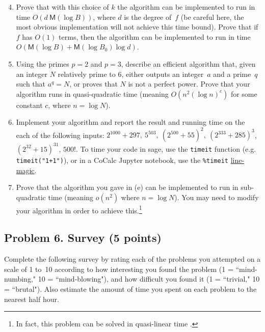 \documentclass[11pt]{article}
\newcommand{\M}{\textsf{M}}
\begin{document}
\begin{enumerate}[{\bf (a)}]
\setcounter{enumi}{3}
\item
Prove that with this choice of $k$ the algorithm can be implemented to run in time $O(d\ \M(\log B))$, where $d$ is the degree of~$f$ (be careful here, the most obvious implementation will not achieve this time bound).
Prove that if $f$ has $O(1)$ terms, then the algorithm can be implemented to run in time $O(\M(\log B) + \M(\log B_0)\log d)$.

\item
Using the primes $p=2$ and $p=3$, describe an efficient algorithm that, given an integer $N$ relatively prime to 6, either outputs an integer~$a$ and a prime~$q$ such that $a^q=N$, or proves that $N$ is not a perfect power.
Prove that your algorithm runs in quasi-quadratic time (meaning $O(n^2(\log n)^c)$ for some constant $c$, where $n=\log N$).
\end{enumerate}

\begin{enumerate}[{\bf (a)}]
\setcounter{enumi}{5}
\item
Implement your algorithm and report the result and running time on the each of the following inputs:
$2^{1000}+297,\ 5^{503},\ (2^{500}+55)^2,\ (2^{333}+285)^3$, $(2^{32}+15)^{31}$, $500!$.
To time your code in sage, use the \texttt{timeit} function (e.g. \texttt{timeit("1+1")}), or in a CoCalc Jupyter notebook, use the \texttt{\%timeit} \href{https://share.cocalc.com/share/8b892baf91f98d0cf6172b872c8ad6694d0f7204/PythonDataScienceHandbook/notebooks/01.07-Timing-and-Profiling.ipynb}{line-magic}.
\item
Prove that the algorithm you gave in (e) can be implemented to run in sub-quadratic time (meaning $o(n^2)$ where $n=\log N$).  You may need to modify your algorithm in order to achieve this.\footnote{In fact, this problem can be solved in quasi-linear time \cite{bernstein}.}
\end{enumerate}

\subsection*{Problem 6. Survey (5 points)}
Complete the following survey by rating each of the problems you attempted on a scale of 1 to~10 according to how interesting you found the problem (1 = ``mind-numbing," 10 = ``mind-blowing"), and how difficult you found it (1 = ``trivial," 10 = ``brutal").  Also estimate the amount of time you spent on each problem to the nearest half hour.
\end{document}
